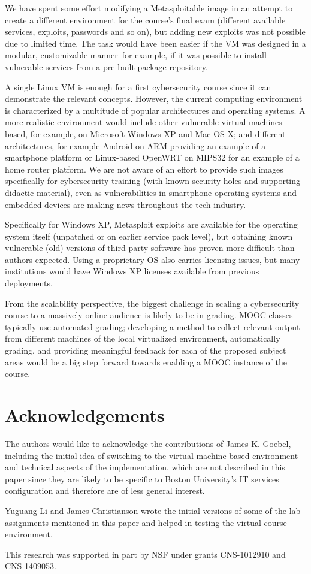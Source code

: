 \documentclass{sig-alternate-2013}
\begin{document}
We have spent some effort modifying a Metasploitable image in an attempt to create a different environment for
the course's final exam (different available services, exploits, passwords and so on), but
adding new exploits was not possible due to limited time. The task would have been easier if the VM was designed in a modular,
customizable manner--for example, if it was possible to install vulnerable services from a pre-built package repository.

A single Linux VM is enough for a first cybersecurity course since it can demonstrate the relevant concepts. However,
the current computing environment is characterized by a multitude of popular architectures and operating systems.
A more realistic environment would include other vulnerable virtual machines based, for example, on Microsoft 
Windows XP and Mac OS X; and different architectures, for example Android on ARM providing an example
of a smartphone platform or Linux-based OpenWRT on MIPS32 for an example of a home router platform. 
We are not aware of an effort to provide such images specifically for cybersecurity training (with known security
holes and supporting didactic material), even as vulnerabilities in smartphone operating systems and embedded 
devices are making news throughout the tech industry.

Specifically for Windows XP, Metasploit exploits are available for the operating system itself (unpatched or on earlier service 
pack level), but obtaining known vulnerable (old) versions of third-party software has proven more difficult than authors
expected. Using a proprietary OS also carries licensing issues, but many institutions would have Windows XP licenses available
from previous deployments.

From the scalability perspective, the biggest challenge in scaling a cybersecurity course to a massively online audience is likely
to be in grading. MOOC classes typically use automated grading; developing a method to collect relevant output from different machines
of the local virtualized environment, automatically grading, and providing meaningful feedback for each of the proposed subject areas 
would be a big step forward towards enabling a MOOC instance of the course.

\section*{Acknowledgements}

The authors would like to acknowledge the contributions of James K. Goebel,
including the initial idea of switching to the virtual machine-based environment and technical aspects of the implementation,
which are not described in this paper since they are likely to be specific to Boston University's IT services %
configuration and therefore are of less general interest.

Yuguang Li and James Christianson wrote the initial versions of some of the
lab assignments mentioned in this paper and helped in testing the virtual course environment.

This research was supported in part by NSF under grants CNS-1012910 and CNS-1409053.

\printbibliography
\end{document}
